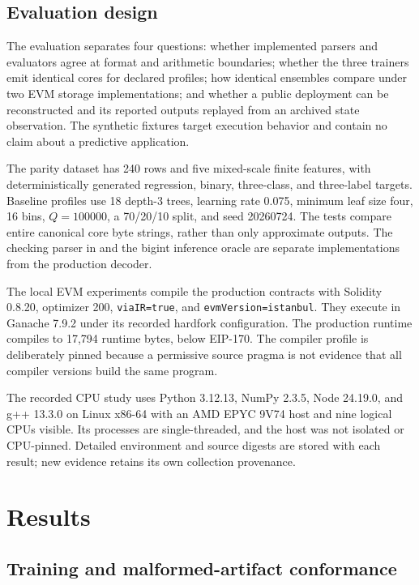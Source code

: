 \documentclass{ledger}
\newcommand{\codeword}[1]{\texttt{#1}}
\begin{document}
\subsection{Evaluation design}

The evaluation separates four questions: whether implemented parsers and
evaluators agree at format and arithmetic boundaries; whether the three
trainers emit identical cores for declared profiles; how identical ensembles
compare under two EVM storage implementations; and whether a public deployment
can be reconstructed and its reported outputs replayed from an archived state
observation. The synthetic fixtures target execution behavior and contain no
claim about a predictive application.

The parity dataset has 240 rows and five mixed-scale finite features, with
deterministically generated regression, binary, three-class, and three-label
targets. Baseline profiles use 18 depth-3 trees, learning rate 0.075, minimum
leaf size four, 16 bins, $Q=100000$, a 70/20/10 split, and seed 20260724.
The tests compare entire canonical core byte strings, rather than only
approximate outputs. The checking parser in
 and the bigint inference oracle are
separate implementations from the production decoder.

The local EVM experiments compile the production contracts with Solidity
0.8.20, optimizer 200, \codeword{viaIR=true}, and
\codeword{evmVersion=istanbul}.\cite{solidity0820} They execute in Ganache
7.9.2 under its recorded hardfork configuration.\cite{ganache792} The
production runtime compiles to 17,794 runtime bytes, below EIP-170. The
compiler profile is deliberately pinned because a permissive source pragma
is not evidence that all compiler versions build the same program.

The recorded CPU study uses Python 3.12.13, NumPy 2.3.5,\cite{harris2020numpy}
Node 24.19.0, and g++ 13.3.0 on Linux x86-64 with an AMD EPYC 9V74 host and
nine logical CPUs visible. Its processes are single-threaded, and the host
was not isolated or CPU-pinned. Detailed environment and source digests are
stored with each result; new evidence retains its own collection provenance.

\section{Results}
\label{sec:results}

\subsection{Training and malformed-artifact conformance}
\end{document}
